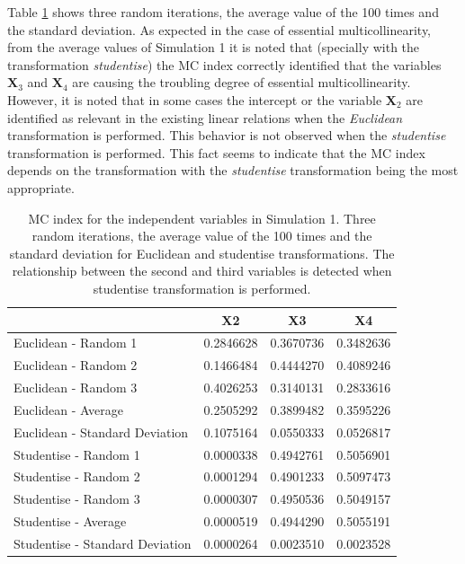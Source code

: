 Table \ref{tab:Simulation1randomlatex} shows three random iterations, the average value of the 100 times and the standard deviation. As expected in the case of essential multicollinearity, from the average values of Simulation 1 it is noted that (specially with the transformation \emph{studentise}) the MC index correctly identified that the variables \(\mathbf{X}_{3}\) and \(\mathbf{X}_{4}\) are causing the troubling degree of essential multicollinearity. However, it is noted that in some cases the intercept or the variable \(\mathbf{X}_{2}\) are identified as relevant in the existing linear relations when the \emph{Euclidean} transformation is performed. This behavior is not observed when the \emph{studentise} transformation is performed. This fact seems to indicate that the MC index depends on the transformation with the \emph{studentise} transformation being the most appropriate.

\begin{table}

\caption{\label{tab:Simulation1randomlatex}MC index for the independent variables in Simulation 1. Three random iterations, the average value of the 100 times and the standard deviation for Euclidean and studentise transformations. The relationship between the second and third variables is detected when studentise transformation is performed.}
\centering
\begin{tabular}[t]{l|c|c|c}
\hline
  & X2 & X3 & X4\\
\hline
Euclidean - Random 1 & 0.2846628 & 0.3670736 & 0.3482636\\
\hline
Euclidean - Random 2 & 0.1466484 & 0.4444270 & 0.4089246\\
\hline
Euclidean - Random 3 & 0.4026253 & 0.3140131 & 0.2833616\\
\hline
Euclidean - Average & 0.2505292 & 0.3899482 & 0.3595226\\
\hline
Euclidean - Standard Deviation & 0.1075164 & 0.0550333 & 0.0526817\\
\hline
Studentise - Random 1 & 0.0000338 & 0.4942761 & 0.5056901\\
\hline
Studentise - Random 2 & 0.0001294 & 0.4901233 & 0.5097473\\
\hline
Studentise - Random 3 & 0.0000307 & 0.4950536 & 0.5049157\\
\hline
Studentise - Average & 0.0000519 & 0.4944290 & 0.5055191\\
\hline
Studentise - Standard Deviation & 0.0000264 & 0.0023510 & 0.0023528\\
\hline
\end{tabular}
\end{table}

